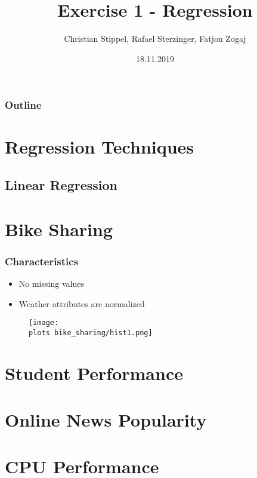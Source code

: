 \documentclass[aspectratio=169]{beamer}
\title[Your Short Title]{Exercise 1 - Regression}
\author{Christian Stippel, Rafael Sterzinger, Fatjon Zogaj}
\institute{Machine Learning}
\date{18.11.2019}
\def \plots {./plots/}
\begin{document}
\begin{frame}
  \titlepage
\end{frame}

\begin{frame}
\frametitle{Outline}
\tableofcontents
\end{frame}

\section{Regression Techniques}
\subsection{Linear Regression}

\section{Bike Sharing}

\begin{frame}{}
\frametitle{Characteristics}
\begin{itemize}
\item No missing values
\item Weather attributes are normalized
\end{itemize}
\end{frame}

\begin{frame}
    \begin{figure}
        \centering
        \texttt{[image: \\plots bike\_sharing/hist1.png]}
    \end{figure}
\end{frame}

\section{Student Performance}

\section{Online News Popularity}

\section{CPU Performance}
\end{document}
